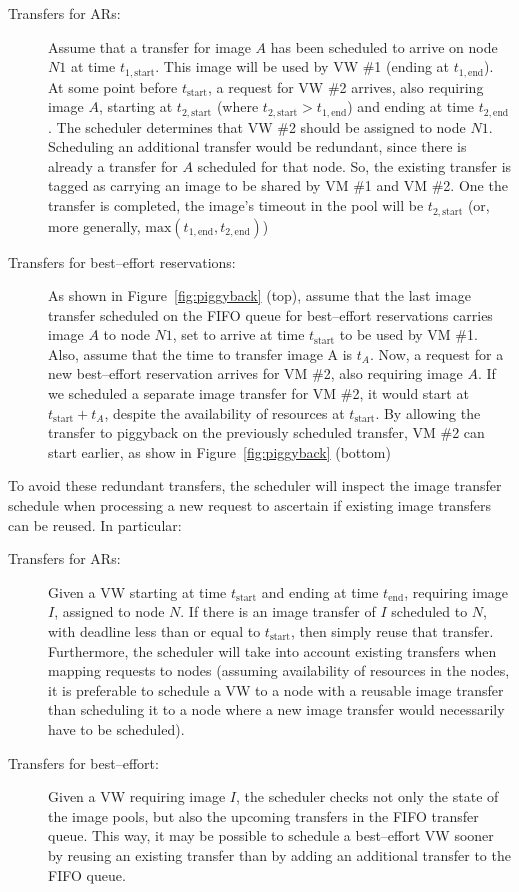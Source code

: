 \begin{description}
\item[Transfers for ARs:] Assume that a transfer for image $A$ has been scheduled to arrive on node $N1$ at time $t_{1,\textrm{start}}$. This image will be used by VW \#1 (ending at $t_{1,\textrm{end}}$). At some point before $t_\textrm{start}$, a request for VW \#2 arrives, also requiring image $A$, starting at $t_{2,\textrm{start}}$ (where $t_{2,\textrm{start}}>t_{1,\textrm{end}}$) and ending at time $t_{2,\textrm{end}}$. The scheduler determines that VW \#2 should be assigned to node $N1$. Scheduling an additional transfer would be redundant, since there is already a transfer for $A$ scheduled for that node. So, the existing transfer is tagged as carrying an image to be shared by VM \#1 and VM \#2. One the transfer is completed, the image's timeout in the pool will be $t_{2,\textrm{start}}$ (or, more generally, $\textrm{max}(t_{1,\textrm{end}},t_{2,\textrm{end}})$)
\item[Transfers for best--effort reservations:] As shown in Figure~\ref{fig:piggyback} (top), assume that the last image transfer scheduled on the FIFO queue for best--effort reservations carries image $A$ to node $N1$, set to arrive at time $t_\textrm{start}$ to be used by VM \#1. Also, assume that the time to transfer image A is $t_A$. Now, a request for a new best--effort reservation arrives for VM \#2, also requiring image $A$. If we scheduled a separate image transfer for VM \#2, it would start at $t_\textrm{start}+t_A$, despite the availability of resources at $t_\textrm{start}$. By allowing the transfer to piggyback on the previously scheduled transfer, VM \#2 can start earlier, as show in Figure~\ref{fig:piggyback} (bottom)
\end{description}

To avoid these redundant transfers, the scheduler will inspect the image transfer schedule when processing a new request to ascertain if existing image transfers can be reused. In particular:

\begin{description}
\item[Transfers for ARs:] Given a VW starting at time $t_\textrm{start}$ and ending at time $t_\textrm{end}$, requiring image $I$, assigned to node $N$. If there is an image transfer of $I$ scheduled to $N$, with deadline less than or equal to $t_\textrm{start}$, then simply reuse that transfer. Furthermore, the scheduler will take into account existing transfers when mapping requests to nodes (assuming availability of resources in the nodes, it is preferable to schedule a VW to a node with a reusable image transfer than scheduling it to a node where a new image transfer would necessarily have to be scheduled).
\item[Transfers for best--effort:] Given a VW requiring image $I$, the scheduler checks not only the state of the image pools, but also the upcoming transfers in the FIFO transfer queue. This way, it may be possible to schedule a best--effort VW sooner by reusing an existing transfer than by adding an additional transfer to the FIFO queue.
\end{description}





